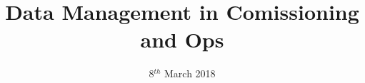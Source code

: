 


\title{Data Management in Comissioning and Ops}
\date{ 8$^{th}$ March 2018}


\graphicspath{{./figures} {./images/}{../../dm-docs/images/} }







